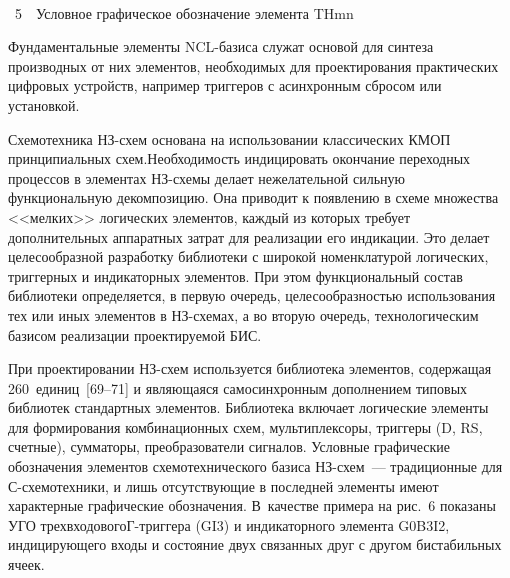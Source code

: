 \begin{multicols}{2}
      \columnbreak
      
      \noindent
\begin{center}  %
\mbox{%
 \epsfxsize=52.356mm
 }
  \end{center}

  \vspace*{-3pt}

\noindent
{{\figurename~5}\ \ \small{Условное графическое обозначение элемента THmn}}

\vspace*{12pt}

      

\addtocounter{figure}{1}
       

      

       Фундаментальные элементы NCL-ба\-зи\-са служат основой для синтеза 
производных от них элементов, необходимых для проектирования практических цифровых 
устройств, например триггеров с асинхронным сбросом или установкой.
       
       Схемотехника НЗ-схем основана на использовании классических КМОП 
принципиальных схем.\linebreak Необходимость индицировать окончание пе\-ре\-ходных процессов в 
элементах НЗ-схе\-мы делает нежелательной сильную функциональную декомпозицию. Она 
приводит к появлению в схеме множества <<мелких>> логических элементов, каждый из 
которых требует дополнительных аппаратных затрат для реализации его индикации. Это 
делает целесообразной разработку библиотеки с широкой номенклатурой логических, 
триггерных и индикаторных элементов. При этом функциональный состав библиотеки 
определяется, в первую очередь, целесообразностью использования тех или иных элементов 
в НЗ-схе\-мах, а во вторую очередь, технологическим базисом реализации проектируемой 
БИС. 
       
       При проектировании НЗ-схем используется биб\-ли\-о\-те\-ка элементов, содержащая 
260~единиц~[69--71] и являющаяся самосинхронным дополнением 
типовых библиотек стандартных элементов. Биб\-ли\-о\-те\-ка включает логические элементы для 
формирования комбинационных схем, мультиплексоры, триггеры (D, RS, счетные), 
сумматоры, преобразователи сигналов. Условные графические обозначения 
элементов схемотехнического базиса 
       НЗ-схем~--- традиционные для С-схе\-мо\-тех\-ни\-ки, и лишь отсутствующие в 
последней элементы имеют характерные графические обозначения.  В~качестве  примера на  
рис.~6  показаны  УГО трехвходового\linebreak Г-триг\-ге\-ра (GI3) и индикаторного элемента G0B3I2, 
индицирующего входы и состояние двух связанных друг с другом бистабильных ячеек.
      

\end{multicols}
